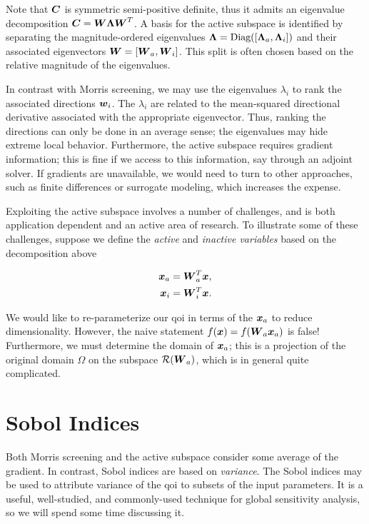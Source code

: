 \documentclass[../primer.tex]{subfiles}
\begin{document}
\noindent Note that \(\boldsymbol{C}\) is symmetric semi-positive definite, thus it admits an
eigenvalue decomposition \(\boldsymbol{C}=\boldsymbol{W}\boldsymbol{\Lambda}\boldsymbol{W}^T\). A basis for the active
subspace is identified by separating the magnitude-ordered eigenvalues
\(\boldsymbol{\Lambda}=\text{Diag}([\boldsymbol{\Lambda}_a,\boldsymbol{\Lambda}_i])\) and their associated
eigenvectors \(\boldsymbol{W}=[\boldsymbol{W}_a,\boldsymbol{W}_i]\). This split is often chosen based on the
relative magnitude of the eigenvalues.

In contrast with Morris screening, we may use the eigenvalues \(\lambda_i\) to
rank the associated directions \(\boldsymbol{w}_i\). The \(\lambda_i\) are related to the
mean-squared directional derivative associated with the appropriate eigenvector.
Thus, ranking the directions can only be done in an average sense; the
eigenvalues may hide extreme local behavior. Furthermore, the active subspace
requires gradient information; this is fine if we access to this information,
say through an adjoint solver. If gradients are unavailable, we would need to
turn to other approaches, such as finite differences or surrogate modeling,
which increases the expense.

Exploiting the active subspace involves a number of challenges, and is both
application dependent and an active area of research. To illustrate some of
these challenges, suppose we define the \emph{active} and \emph{inactive variables} based
on the decomposition above

\begin{equation}\begin{aligned}
  \boldsymbol{x}_a &= \boldsymbol{W}^T_a\boldsymbol{x}, \\
  \boldsymbol{x}_i &= \boldsymbol{W}^T_i\boldsymbol{x}.
\end{aligned}\end{equation}

\noindent We would like to re-parameterize our qoi in terms of the \(\boldsymbol{x}_a\) to
reduce dimensionality. However, the naive statement \(f(\boldsymbol{x})=f(\boldsymbol{W}_a\boldsymbol{x}_a)\) is
false! Furthermore, we must determine the domain of \(\boldsymbol{x}_a\); this is a
projection of the original domain \(\Omega\) on the subspace \(\mathcal{R}(\boldsymbol{W}_a)\), which
is in general quite complicated.

\section{Sobol Indices}
\label{sec:orgd776a4d}
Both Morris screening and the active subspace consider some average of the
gradient. In contrast, Sobol indices are based on \emph{variance}. The Sobol indices
may be used to attribute variance of the qoi to subsets of the input parameters.
It is a useful, well-studied, and commonly-used technique for global sensitivity
analysis, so we will spend some time discussing it.
\end{document}
